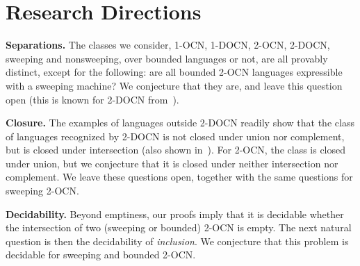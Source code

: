 \documentclass[11pt,a4paper]{amsart}
\newtheorem{proposition}[theorem]{Proposition}
\theoremstyle{definition}
\newcommand{\shtodo}[1]{\todo[color=cyan!25,size=\small]{SH: #1}}
\newcommand{\mysubparagraph}[1]{\noindent \textbf{\textsf{#1}} }
\begin{document}
\section{Research Directions}
\label{sec:results_directions}
\mysubparagraph{Separations.}  
The classes we consider, 1-OCN, 1-DOCN, 2-OCN,
2-DOCN, sweeping and nonsweeping, over bounded languages or not, are all
provably distinct, except for the following: are all bounded 2-OCN languages
expressible with a sweeping machine?  We conjecture that they are, and leave
this question open (this is known for 2-DOCN from~\cite{chan1987two}).

\mysubparagraph{Closure.}
The examples of languages outside 2-DOCN readily show
that the class of languages recognized by 2-DOCN is not closed under union nor
complement, but is closed under intersection (also shown in~\cite{miyano1982two}). For 2-OCN, the class is closed
under union, but we conjecture that it is closed under neither intersection nor
complement.  We leave these questions open, together with the same questions for
sweeping 2-OCN.

\mysubparagraph{Decidability.}
Beyond emptiness, our proofs imply that it is
decidable whether the intersection of two (sweeping or bounded) 2-OCN is empty.
The next natural question is then the decidability of \emph{inclusion}.  We
conjecture that this problem is decidable for sweeping and bounded 2-OCN.






\end{document}
